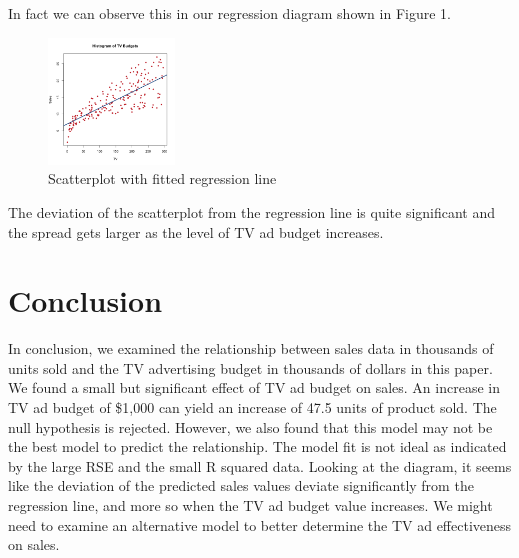 \documentclass{article}
\begin{document}
In fact we can observe this in our regression diagram shown in Figure 1.

\begin{figure}
\centering
\includegraphics[width=0.3\textwidth]{scatterplot-tv-sales.png}
\caption{\label{fig:scatterplot}Scatterplot with fitted regression line}
\end{figure}

The deviation of the scatterplot from the regression line is quite significant and the spread gets larger as the level of TV ad budget increases.

\section{Conclusion}

In conclusion, we examined the relationship between sales data in thousands of units sold and the TV advertising budget in thousands of dollars in this paper. We found a small but significant effect of TV ad budget on sales. An increase in TV ad budget of \$1,000 can yield an increase of 47.5 units of product sold. The null hypothesis is rejected. However, we also found that this model may not be the best model to predict the relationship. The model fit is not ideal as indicated by the large RSE and the small R squared data. Looking at the diagram, it seems like the deviation of the predicted sales values deviate significantly from the regression line, and more so when the TV ad budget value increases. We might need to examine an alternative model to better determine the TV ad effectiveness on sales.
\end{document}
